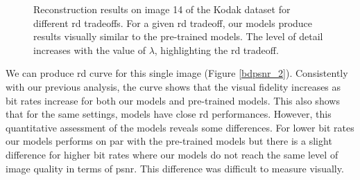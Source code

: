\begin{figure}[H]
    \centering
    \caption[Reconstruction results on image 14 of the Kodak dataset for different \acrshort{rd} tradeoffs.]{Reconstruction results on image 14 of the Kodak dataset for different \acrshort{rd} tradeoffs. For a given \acrshort{rd} tradeoff, our models produce results visually similar to the pre-trained models. The level of detail increases with the value of \(\lambda\), highlighting the \acrshort{rd} tradeoff.}
    \label{bdpsnr_1}
\end{figure}

We can produce \acrshort{rd} curve for this single image (Figure \ref{bdpsnr_2}). Consistently with our previous analysis, the curve shows that the visual fidelity increases as bit rates increase for both our models and pre-trained models. This also shows that for the same settings, models have close \acrshort{rd} performances. However, this quantitative assessment of the models reveals some differences. For lower bit rates our models performs on par with the pre-trained models but there is a slight difference for higher bit rates where our models do not reach the same level of image quality in terms of \acrshort{psnr}. This difference was difficult to measure visually.


